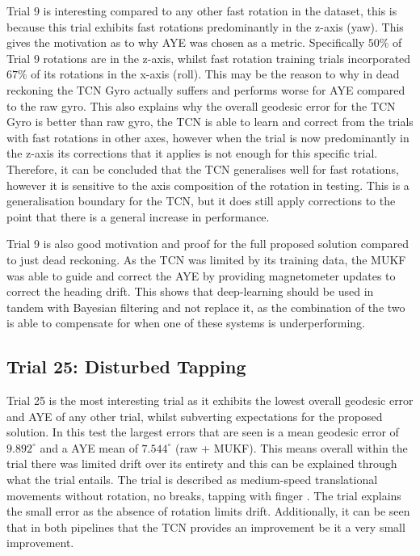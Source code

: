 Trial 9 is interesting compared to any other fast rotation in the dataset, this is because this trial exhibits fast rotations predominantly in the z-axis (yaw). This gives the motivation
as to why AYE was chosen as a metric. Specifically $50\%$ of Trial 9 rotations are in the z-axis, whilst fast rotation training trials incorporated $67\%$ of its rotations in the x-axis (roll). This may be
the reason to why in dead reckoning the TCN Gyro actually suffers and performs worse for AYE compared to the raw gyro. This also explains why the overall geodesic error for the TCN Gyro is better than 
raw gyro, the TCN is able to learn and correct from the trials with fast rotations in other axes, however when the trial is now predominantly in the z-axis its corrections that it applies is not enough
for this specific trial. Therefore, it can be concluded that the TCN generalises well for fast rotations, however it is sensitive to the axis composition of the rotation in testing. This is a generalisation 
boundary for the TCN, but it does still apply corrections to the point that there is a general increase in performance.

Trial 9 is also good motivation and proof for the full proposed solution compared to just dead reckoning. As the TCN was limited by its training data, the MUKF was able to guide and correct the AYE by providing 
magnetometer updates to correct the heading drift. This shows that deep-learning should be used in tandem with Bayesian filtering and not replace it, 
as the combination of the two is able to compensate for when one of these systems is underperforming.


\subsection{Trial 25: Disturbed Tapping}

Trial 25 is the most interesting trial as it exhibits the lowest overall geodesic error and AYE of any other trial, whilst subverting expectations for the proposed solution.
In this test the largest errors that are seen is a mean geodesic error of $9.892^{\circ}$ and 
a AYE mean of $7.544^{\circ}$ (raw + MUKF). This means overall within the trial there was limited drift over its entirety and this can be explained through what the trial entails. The trial is described as 
medium-speed translational movements without rotation, no breaks, tapping with finger \cite{laidig_2021_broada}. The trial explains the small error as the
absence of rotation limits drift. Additionally, it can
be seen that in both pipelines that the TCN provides an improvement be it a very small improvement.

